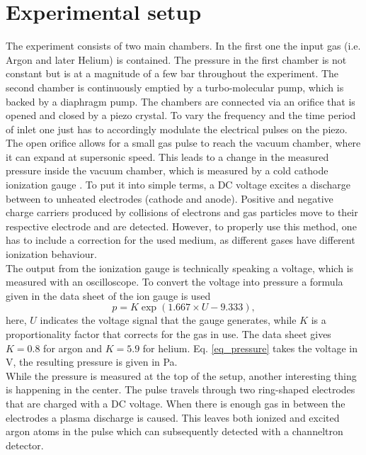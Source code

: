 \documentclass[a4paper,10pt]{article}
\begin{document}
\section{Experimental setup}
The experiment consists of two main chambers. In the first one the input gas (i.e. Argon and later Helium) is contained. The pressure in the first chamber is not constant but is at a magnitude of a few \si{\bar} throughout the experiment. The second chamber is continuously emptied by a turbo-molecular pump, which is backed by a diaphragm pump. The chambers are connected via an orifice that is opened and closed by a piezo crystal. To vary the frequency and the time period of inlet one just has to accordingly modulate the electrical pulses on the piezo.
\newline
The open orifice allows for a small gas pulse to reach the vacuum chamber, where it can expand at supersonic speed. This leads to a change in the measured pressure inside the vacuum chamber, which is measured by a cold cathode ionization gauge \cite{cold_cathode}. To put it into simple terms, a DC voltage excites a discharge between to unheated electrodes (cathode and anode). Positive and negative charge carriers produced by collisions of electrons and gas particles move to their respective electrode and are detected. However, to properly use this method, one has to include a correction for the used medium, as different gases have different ionization behaviour.
\\
The output from the ionization gauge is technically speaking a voltage, which is measured with an oscilloscope. To convert the voltage into pressure a formula given in the data sheet of the ion gauge \cite{datasheet_pfeiffer} is used
\begin{equation}
	\label{eq_pressure}
	p = K \exp(1.667 \times U - 9.333),
\end{equation}
here, $U$ indicates the voltage signal that the gauge generates, while $K$ is a proportionality factor that corrects for the gas in use. The data sheet gives $K= 0.8$ for argon and $K = 5.9$ for helium. Eq. \ref{eq_pressure} takes the voltage in \si{\volt}, the resulting pressure is given in \si{\pascal}.
\\
While the pressure is measured at the top of the setup, another interesting thing is happening in the center. The pulse travels through two ring-shaped electrodes that are charged with a DC voltage. When there is enough gas in between the electrodes a plasma discharge is caused. This leaves both ionized and excited argon atoms in the pulse which can subsequently detected with a channeltron detector.\\
\end{document}
